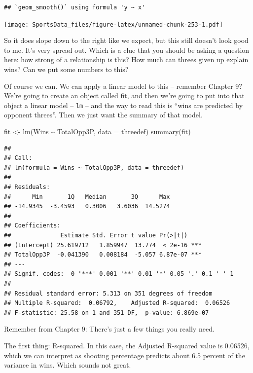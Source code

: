 \documentclass[
]{book}
\newenvironment{Shaded}{\begin{snugshade}}{\end{snugshade}}
\newcommand{\AttributeTok}[1]{\textcolor[rgb]{0.77,0.63,0.00}{#1}}
\newcommand{\FunctionTok}[1]{\textcolor[rgb]{0.00,0.00,0.00}{#1}}
\newcommand{\NormalTok}[1]{#1}
\newcommand{\OtherTok}[1]{\textcolor[rgb]{0.56,0.35,0.01}{#1}}
\newcommand{\SpecialCharTok}[1]{\textcolor[rgb]{0.00,0.00,0.00}{#1}}
\begin{document}
\begin{verbatim}
## `geom_smooth()` using formula 'y ~ x'
\end{verbatim}

\texttt{[image: SportsData\_files/figure-latex/unnamed-chunk-253-1.pdf]}

So it does slope down to the right like we expect, but this still doesn't look good to me. It's very spread out. Which is a clue that you should be asking a question here: how strong of a relationship is this? How much can threes given up explain wins? Can we put some numbers to this?

Of course we can. We can apply a linear model to this -- remember Chapter 9? We're going to create an object called fit, and then we're going to put into that object a linear model -- \texttt{lm} -- and the way to read this is ``wins are predicted by opponent threes''. Then we just want the summary of that model.

\begin{Shaded}
\begin{Highlighting}[]
\NormalTok{fit }\OtherTok{\textless{}{-}} \FunctionTok{lm}\NormalTok{(Wins }\SpecialCharTok{\textasciitilde{}}\NormalTok{ TotalOpp3P, }\AttributeTok{data =}\NormalTok{ threedef)}
\FunctionTok{summary}\NormalTok{(fit)}
\end{Highlighting}
\end{Shaded}

\begin{verbatim}
## 
## Call:
## lm(formula = Wins ~ TotalOpp3P, data = threedef)
## 
## Residuals:
##      Min       1Q   Median       3Q      Max 
## -14.9345  -3.4593   0.3006   3.6036  14.5274 
## 
## Coefficients:
##              Estimate Std. Error t value Pr(>|t|)    
## (Intercept) 25.619712   1.859947  13.774  < 2e-16 ***
## TotalOpp3P  -0.041390   0.008184  -5.057 6.87e-07 ***
## ---
## Signif. codes:  0 '***' 0.001 '**' 0.01 '*' 0.05 '.' 0.1 ' ' 1
## 
## Residual standard error: 5.313 on 351 degrees of freedom
## Multiple R-squared:  0.06792,    Adjusted R-squared:  0.06526 
## F-statistic: 25.58 on 1 and 351 DF,  p-value: 6.869e-07
\end{verbatim}

Remember from Chapter 9: There's just a few things you really need.

The first thing: R-squared. In this case, the Adjusted R-squared value is 0.06526, which we can interpret as shooting percentage predicts about 6.5 percent of the variance in wins. Which sounds not great.
\end{document}
